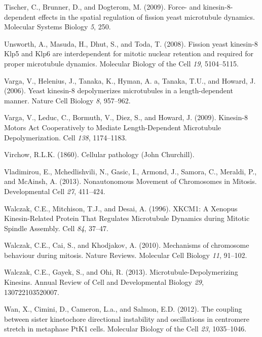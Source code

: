 \documentclass[12pt,a4paper,twoside,openright]{book}
\begin{document}
Tischer, C., Brunner, D., and Dogterom, M. (2009). Force- and
kinesin-8-dependent effects in the spatial regulation of fission yeast
microtubule dynamics. Molecular Systems Biology \emph{5}, 250.

Unsworth, A., Masuda, H., Dhut, S., and Toda, T. (2008). Fission yeast
kinesin-8 Klp5 and Klp6 are interdependent for mitotic nuclear retention
and required for proper microtubule dynamics. Molecular Biology of the
Cell \emph{19}, 5104--5115.

Varga, V., Helenius, J., Tanaka, K., Hyman, A. a, Tanaka, T.U., and
Howard, J. (2006). Yeast kinesin-8 depolymerizes microtubules in a
length-dependent manner. Nature Cell Biology \emph{8}, 957--962.

Varga, V., Leduc, C., Bormuth, V., Diez, S., and Howard, J. (2009).
Kinesin-8 Motors Act Cooperatively to Mediate Length-Dependent
Microtubule Depolymerization. Cell \emph{138}, 1174--1183.

Virchow, R.L.K. (1860). Cellular pathology (John Churchill).

Vladimirou, E., Mchedlishvili, N., Gasic, I., Armond, J., Samora, C.,
Meraldi, P., and McAinsh, A. (2013). Nonautonomous Movement of
Chromosomes in Mitosis. Developmental Cell \emph{27}, 411--424.

Walczak, C.E., Mitchison, T.J., and Desai, A. (1996). XKCM1: A Xenopus
Kinesin-Related Protein That Regulates Microtubule Dynamics during
Mitotic Spindle Assembly. Cell \emph{84}, 37--47.

Walczak, C.E., Cai, S., and Khodjakov, A. (2010). Mechanisms of
chromosome behaviour during mitosis. Nature Reviews. Molecular Cell
Biology \emph{11}, 91--102.

Walczak, C.E., Gayek, S., and Ohi, R. (2013). Microtubule-Depolymerizing
Kinesins. Annual Review of Cell and Developmental Biology \emph{29},
130722103520007.

Wan, X., Cimini, D., Cameron, L.a., and Salmon, E.D. (2012). The
coupling between sister kinetochore directional instability and
oscillations in centromere stretch in metaphase PtK1 cells. Molecular
Biology of the Cell \emph{23}, 1035--1046.
\end{document}
